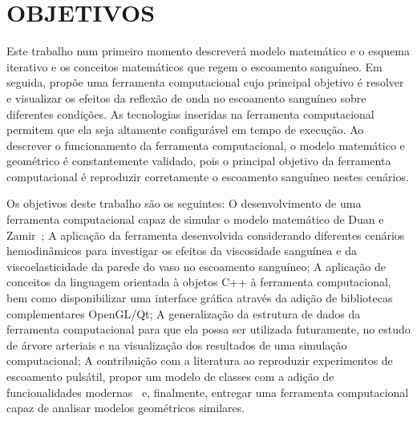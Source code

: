 
\section{OBJETIVOS}\label{sec:obj}

Este trabalho num primeiro momento descreverá modelo matemático e o esquema iterativo e os conceitos matemáticos que regem o escoamento sanguíneo. Em seguida, propõe uma ferramenta computacional cujo principal objetivo é resolver e visualizar os efeitos da reflexão de onda no escoamento sanguíneo sobre diferentes condições. As tecnologias inseridas na ferramenta computacional permitem que ela seja altamente configurável em tempo de execução. Ao descrever o funcionamento da ferramenta computacional, o modelo matemático e geométrico é constantemente validado, pois o principal objetivo da ferramenta computacional é reproduzir corretamente o escoamento sanguíneo nestes cenários.

Os objetivos deste trabalho são os seguintes: O desenvolvimento de uma ferramenta computacional capaz de simular o modelo matemático de Duan e Zamir~\cite{Duan1992}; A aplicação da ferramenta desenvolvida considerando diferentes cenários hemodinâmicos para investigar os efeitos da viscosidade sanguínea e da viscoelasticidade da parede do vaso no escoamento sanguíneo; A aplicação de conceitos da linguagem orientada à objetos C++ à ferramenta computacional, bem como disponibilizar uma interface gráfica através da adição de bibliotecas complementares OpenGL/Qt; A generalização da estrutura de dados da ferramenta computacional para que ela possa ser utilizada futuramente, no estudo de árvore arteriais e na visualização dos resultados de uma simulação computacional; A contribuição com a literatura ao reproduzir experimentos de escoamento pulsátil, propor um modelo de classes com a adição de funcionalidades modernas~\cite{factorypattern,QTClasses} e, finalmente, entregar uma ferramenta computacional capaz de analisar modelos geométricos similares.


